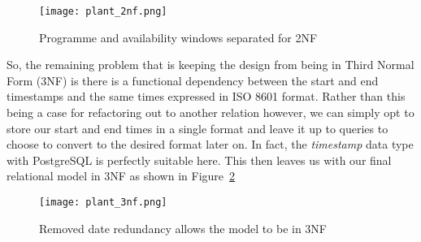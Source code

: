 \documentclass[11pt,a4paper]{article}
\begin{document}
\begin{comment}
  @startuml plant_2nf.png
  class Programme {
    pid
    complete_title
    media_type
    masterbrand
    brand_pid
    is_clip
  }
  class AvailabilityWindow {
    start_time
    end_time
    epoch_start
    epoch_end
    service
  }
  class Category {
    id
    level
    title
  }
  class Tag {
    title
  }
  Programme "1" -d- "0..*" AvailabilityWindow
  Programme "0..*" -r- "0..*" Category
  Programme "0..*" -l- "0..*" Tag
  @enduml
\end{comment}
\begin{figure}[p]
  \begin{center}
    \texttt{[image: plant\_2nf.png]}
  \end{center}
  \caption{Programme and availability windows separated for 2NF}
  \label{fig:2nf}
\end{figure}

So, the remaining problem that is keeping the design from being in
Third Normal Form (3NF) is there is a functional dependency
between the start and end timestamps and the same times expressed
in ISO 8601 format. Rather than this being a case for refactoring
out to another relation however, we can simply opt to store
our start and end times in a single format and leave it up to queries
to choose to convert to the desired format later on. In fact, the
\emph{timestamp} data type with PostgreSQL is perfectly suitable
here. This then leaves us with our final relational model in 3NF
as shown in Figure~\ref{fig:3nf}

\begin{comment}
  @startuml plant_3nf.png
  class Programme {
    pid : varchar
    complete_title : varchar
    media_type : enum ('video, 'audio')
    masterbrand : varchar
    brand_pid : varchar
    is_clip : boolean
  }
  class AvailabilityWindow {
    start_time : timestamp
    end_time : timestamp
    service : varchar
  }
  class Category {
    id : varchar
    level : smallint
    title : varchar
  }
  class Tag {
    title : varchar
  }
  Programme "1" -d- "0..*" AvailabilityWindow
  Programme "0..*" -r- "0..*" Category
  Programme "0..*" -l- "0..*" Tag
  @enduml
\end{comment}
\begin{figure}[p]
  \begin{center}
    \texttt{[image: plant\_3nf.png]}
  \end{center}
  \caption{Removed date redundancy allows the model to be in 3NF}
  \label{fig:3nf}
\end{figure}
\end{document}
